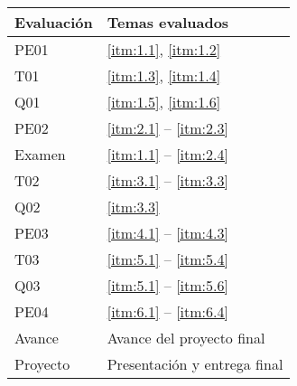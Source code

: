 \begin{longtable}{p{2.5cm}p{5cm}}
  \hline
  \hline
  \textbf{Evaluación} & \textbf{Temas evaluados} \\
  \hline
  PE01 & \ref{itm:1.1}, \ref{itm:1.2} \\
  \hline
  T01 & \ref{itm:1.3}, \ref{itm:1.4} \\
  \hline
  Q01 & \ref{itm:1.5}, \ref{itm:1.6} \\
  \hline
  PE02 & \ref{itm:2.1} -- \ref{itm:2.3} \\
  \hline
  Examen & \ref{itm:1.1} -- \ref{itm:2.4} \\
  \hline
  T02 & \ref{itm:3.1} -- \ref{itm:3.3} \\
  \hline
  Q02 & \ref{itm:3.3} \\
  \hline
  PE03 & \ref{itm:4.1} -- \ref{itm:4.3} \\
  \hline
  T03 & \ref{itm:5.1} -- \ref{itm:5.4} \\
  \hline
  Q03 & \ref{itm:5.1} -- \ref{itm:5.6} \\
  \hline
  PE04 & \ref{itm:6.1} -- \ref{itm:6.4} \\
  \hline
  Avance & Avance del proyecto final \\
  \hline
  Proyecto & Presentación y entrega final\\
  \hline
  \hline
\end{longtable}
